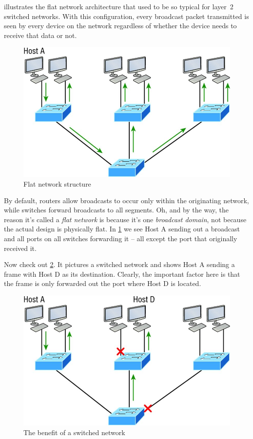 \documentclass[b5paper,11pt]{memoir}
\begin{document}
 illustrates the flat network architecture that used to be so typical for layer~2 switched networks.
With this configuration, every broadcast packet transmitted is seen by every device on the network regardless of whether the device needs to receive that data or not.


\begin{figure}
   \centering
   \includegraphics{images/c11f001.jpg}
   \caption{Flat network structure}
   \label{fig:flat-network-structure}
\end{figure}


By default, routers allow broadcasts to occur only within the originating network, while switches forward broadcasts to all segments.
Oh, and by the way, the reason it's called a \emph{flat network} is because it's one \emph{broadcast domain}, not because the actual design is physically flat.
In \cref{fig:flat-network-structure} we see Host A sending out a broadcast and all ports on all switches forwarding it -- all except the port that originally received it.

Now check out \cref{fig:benefit-switched-network}.
It pictures a switched network and shows Host A sending a frame with Host D as its destination.
Clearly, the important factor here is that the frame is only forwarded out the port where Host D is located.


\begin{figure}
   \centering
   \includegraphics{images/c11f002.jpg}
   \caption{The benefit of a switched network}
   \label{fig:benefit-switched-network}
\end{figure}
\end{document}
